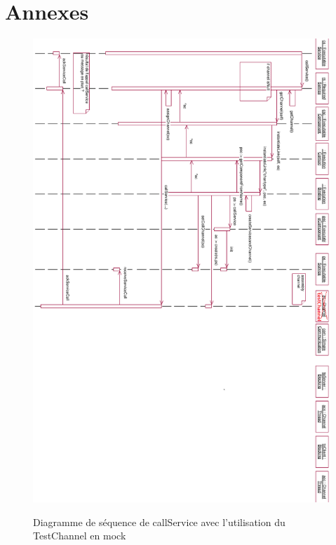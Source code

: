\section*{Annexes}

\begin{figure}
    \begin{center}
        \includegraphics[scale=0.65]{images/seq.png}
        \label{annexe:callServiceSeqMock}
        \caption{Diagramme de séquence de callService avec l'utilisation du TestChannel en mock}
    \end{center}
\end{figure} 

